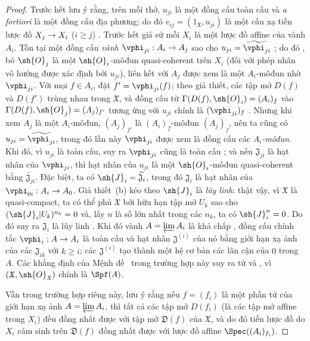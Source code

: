\documentclass[oneside]{amsart}
\makeatletter
\renewcommand{\geq}{\geqslant}
\newcommand{\ega@arrow}[2]{\mathchoice{#1}{#2}{#2}{#2}}
\renewcommand{\to}{\ega@arrow{\longrightarrow}{\rightarrow}}
\makeatother
\begin{document}
\begin{proof}
Trước hết lưu ý rằng, trên mỗi thớ, $u_{ji}$ là một đồng cấu toàn cấu và \emph{a fortiori} là một đồng cấu địa phương; do đó $v_{ij}=(1_\mathfrak{X},u_{ji})$ là một cấu xạ tiền lược đồ $X_j\to X_i$ ($i\geq j$) .
Trước hết giả sử mỗi $X_i$ là một lược đồ affine của vành $A_i$.
Tồn tại một đồng cấu \emph{vành} $\vphi_{ji}:A_i\to A_j$ sao cho $u_{ji}=\widetilde{\vphi_{ji}}$ ; do đó , bó $\sh{O}_j$ là một $\sh{O}_i$-môđun quasi-coherent trên $X_i$ (đối với phép nhân vô hướng được xác định bởi $u_{ji}$), liên kết với $A_j$ được xem là một $A_i$-môđun nhờ $\vphi_{ji}$.
Với mọi $f\in A_i$, đặt $f'=\vphi_{ji}(f)$; theo giả thiết, các tập mở $D(f)$ và $D(f')$ trùng nhau trong $\mathfrak{X}$, và đồng cấu từ $\Gamma(D(f),\sh{O}_i)=(A_i)_f$ vào $\Gamma(D(f),\sh{O}_j)=(A_j)_{f'}$ tương ứng với $u_{ji}$ chính là $(\vphi_{ji})_f$ .
Nhưng khi xem $A_j$ là một $A_i$-môđun, $(A_j)_{f'}$ là $(A_i)_f$-môđun $(A_j)_f$, nên ta cũng có $u_{ji}=\widetilde{\vphi_{ji}}$, trong đó lần này $\vphi_{ji}$ được xem là đồng cấu các \emph{$A_i$-môđun}.
Khi đó, vì $u_{ji}$ là toàn cấu, suy ra $\vphi_{ji}$ cũng là toàn cấu ; và nếu $\mathfrak{J}_{ji}$ là hạt nhân của $\vphi_{ji}$, thì hạt nhân của $u_{ji}$ là một $\sh{O}_i$-môđun quasi-coherent bằng $\widetilde{\mathfrak{J}_{ji}}$.
Đặc biệt, ta có $\sh{J}_i=\widetilde{\mathfrak{J}_i}$, trong đó $\mathfrak{J}_i$ là hạt nhân của $\vphi_{0i}:A_i\to A_0$.
Giả thiết~(b) kéo theo $\sh{J}_i$ là \emph{lũy linh}: thật vậy, vì $\mathfrak{X}$ là quasi-compact, ta có thể phủ $\mathfrak{X}$ bởi hữu hạn tập mở $U_k$ sao cho $(\sh{J}_i|U_k)^{n_k}=0$ và, lấy $n$ là số lớn nhất trong các $n_k$, ta có $\sh{J}_i^n=0$.
Do đó suy ra $\mathfrak{J}_i$ là lũy linh .
Khi đó vành $A=\varprojlim A_i$ là khả chấp , đồng cấu chính tắc $\vphi_i:A\to A_i$ là toàn cấu và hạt nhân $\mathfrak{J}^{(i)}$ của nó bằng giới hạn xạ ảnh của các $\mathfrak{J}_{ik}$ với $k\geq i$; các $\mathfrak{J}^{(i)}$ tạo thành một hệ cơ bản các lân cận của $0$ trong $A$.
Các khẳng định của Mệnh đề~ trong trường hợp này suy ra từ  và , vì $(\mathfrak{X},\sh{O}_\mathfrak{X})$ chính là $\Spf(A)$.

Vẫn trong trường hợp riêng này, lưu ý rằng nếu $f=(f_i)$ là một phần tử của giới hạn xạ ảnh $A=\varprojlim A_i$, thì tất cả các tập mở $D(f_i)$ (là các tập mở affine trong $X_i$) đều đồng nhất được với tập mở $\mathfrak{D}(f)$ của $\mathfrak{X}$, và do đó tiền lược đồ do $X_i$ cảm sinh trên $\mathfrak{D}(f)$ đồng nhất được với lược đồ affine $\Spec((A_i)_{f_i})$.


\end{proof}
\end{document}
